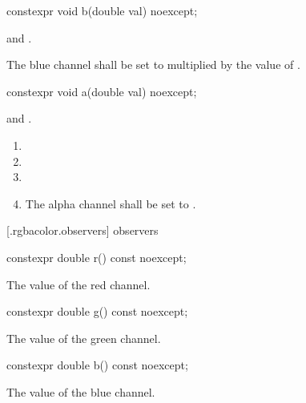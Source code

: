 \begin{itemdecl}
constexpr void b(double val) noexcept;
\end{itemdecl}
\begin{itemdescr}
\pnum
\requires
{} and .

\pnum
\effects
The blue channel shall be set to  multiplied by the value of  .
\end{itemdescr}

\begin{itemdecl}
constexpr void a(double val) noexcept;
\end{itemdecl}
\begin{itemdescr}
\pnum
\requires
{} and .

\pnum
\effects
\begin{enumerate}
\item {}
\item {}
\item {}
\item The alpha channel shall be set to .
\end{enumerate}
\end{itemdescr}

 [\iotwod.rgbacolor.observers]{ observers}

\begin{itemdecl}
constexpr double r() const noexcept;
\end{itemdecl}
\begin{itemdescr}
\pnum
\returns
The value of the red channel.
\end{itemdescr}

\begin{itemdecl}
constexpr double g() const noexcept;
\end{itemdecl}
\begin{itemdescr}
\pnum
\returns
The value of the green channel.
\end{itemdescr}

\begin{itemdecl}
constexpr double b() const noexcept;
\end{itemdecl}
\begin{itemdescr}
\pnum
\returns
The value of the blue channel.
\end{itemdescr}

